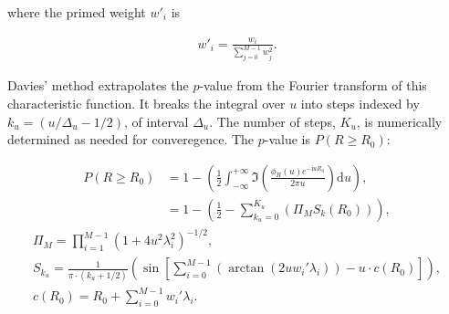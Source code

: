 \noindent where the primed weight $w'_i$ is

\begin{eqnarray}
w'_i = \frac{w_i}{\sum\limits_{j=0}^{M-1} w_j^2}.
\end{eqnarray}

\noindent Davies' method extrapolates the $p$-value from the Fourier transform of this characteristic function.
It breaks the integral over $u$ into steps indexed by $k_u = (u/\Delta_u - 1/2)$, of interval $\Delta_u$.
The number of steps, $K_u$, is numerically determined as needed for converegence.
The $p$-value is $P (R \geq R_0)$:

\begin{eqnarray}
P(R \geq R_0) &= 1 - \left(\frac{1}{2} \int_{-\infty}^{+\infty} \Im \left(\frac{\phi_R(u)e^{-\mathrm{i} u R_0}}{2 \pi u} \right) \mathrm{d}u \right),\\
  &= 1 - \left(\frac{1}{2} - \sum\limits_{k_u = 0}^{K_u} (\Pi_M S_k(R_0)) \right),
\end{eqnarray}
\begin{eqnarray}
\Pi_M = \prod\limits_{i=1}^{M-1} (1 + 4 u^2 \lambda_i^2)^{-1/2},\\
S_{k_u}  = \frac{1}{\pi \cdot (k_u+1/2)}\left(\sin \left[\sum_{i=0}^{M-1} \left( \arctan{(2 u w_i' \lambda_i)} \right) - u \cdot c(R_0)\right] \right),\\
c(R_0) =  R_0 + \sum\limits_{i=0}^{M-1} w_i' \lambda_i.
\end{eqnarray}

% 
%
% 
% 

